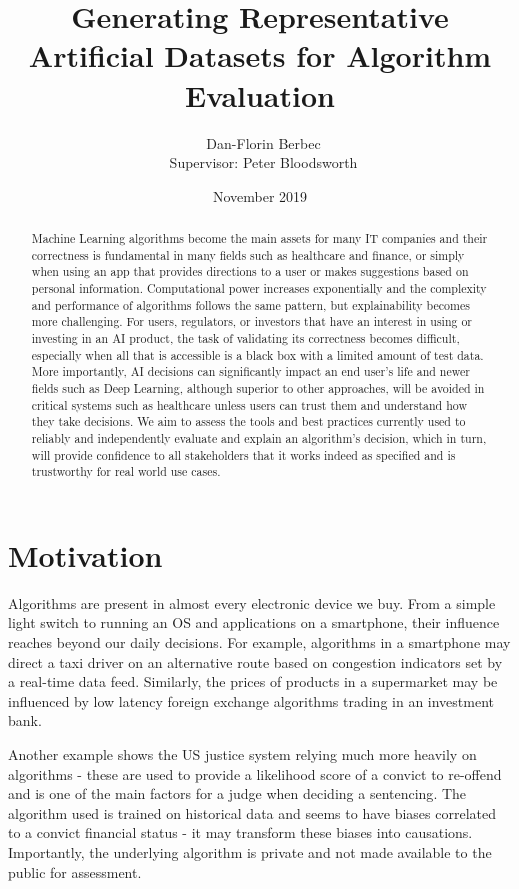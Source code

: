 \documentclass[proposal]{softeng}
\title{Generating Representative Artificial Datasets for Algorithm Evaluation}
\author{\ Dan-Florin Berbec \\ \ Supervisor: Peter Bloodsworth}
\date{November 2019}
\begin{document}
\maketitle

\newpage
\clearpage\mbox{}\clearpage

\begin{abstract}
Machine Learning algorithms become the main assets for many IT companies and their correctness is fundamental in many fields such as healthcare and finance, or simply when using an app that provides directions to a user or makes suggestions based on personal information. Computational power increases exponentially and the complexity and performance of algorithms follows the same pattern, but explainability becomes more challenging. For users, regulators, or investors that have an interest in using or investing in an AI product, the task of validating its correctness becomes difficult, especially when all that is accessible is a black box with a limited amount of test data. More importantly, AI decisions can significantly impact an end user's life and newer fields such as Deep Learning, although superior to other approaches, will be avoided in critical systems such as healthcare unless users can trust them and understand how they take decisions. We aim to assess the tools and best practices currently used to reliably and independently evaluate and explain an algorithm's decision, which in turn, will provide confidence to all stakeholders that it works indeed as specified and is trustworthy for real world use cases.\end{abstract}
 
\tableofcontents
\newpage

\section{Motivation}
Algorithms are present in almost every electronic device we buy. From a simple light switch to running an OS and applications on a smartphone, their influence reaches beyond our daily decisions. For example, algorithms in a smartphone may direct a taxi driver on an alternative route based on congestion indicators set by a real-time data feed. Similarly, the prices of products in a supermarket may be influenced by low latency foreign exchange algorithms trading in an investment bank.

Another example shows the US justice system relying much more heavily on algorithms - these are used to provide a likelihood score of a convict to re-offend and is one of the main factors for a judge when deciding a sentencing\cite{jail}. The algorithm used is trained on historical data and seems to have biases correlated to a convict financial status - it may transform these biases into causations. Importantly, the underlying algorithm is private and not made available to the public for assessment.
\end{document}
